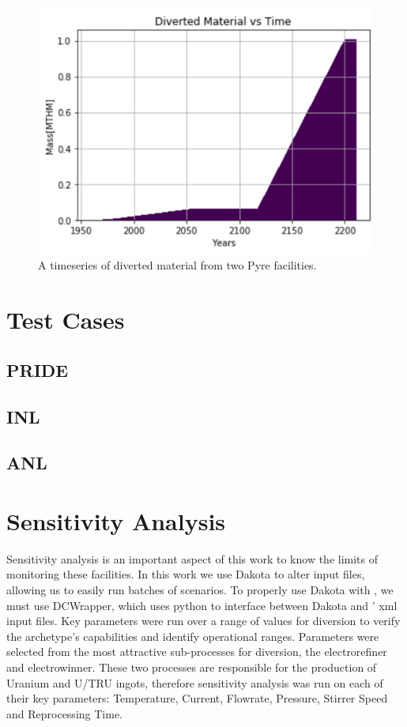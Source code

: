 \begin{figure}
	\centering
	\includegraphics[width=0.9\linewidth]{images/divertmat}
	\caption{A timeseries of diverted material from two Pyre facilities.}
	\label{fig:divertmat}
\end{figure}

\section{Test Cases}

\subsection{PRIDE}

\subsection{INL}

\subsection{ANL}

\section{Sensitivity Analysis}

Sensitivity analysis is an important aspect of this work to know the limits of monitoring these facilities. In this work we use Dakota to alter \Cyclus input files, allowing us to easily
run batches of scenarios. To properly use Dakota with \Cyclus, we must use DCWrapper, which uses python to interface between Dakota and \Cyclus' xml input files. 
Key parameters were run over a range of values for diversion to verify the archetype's capabilities and identify operational ranges. Parameters were selected from the most attractive
sub-processes for diversion, the electrorefiner and electrowinner. These two processes are responsible for the production of Uranium and U/TRU ingots, therefore sensitivity analysis was run
on each of their key parameters: Temperature, Current, Flowrate, Pressure, Stirrer Speed and Reprocessing Time.

